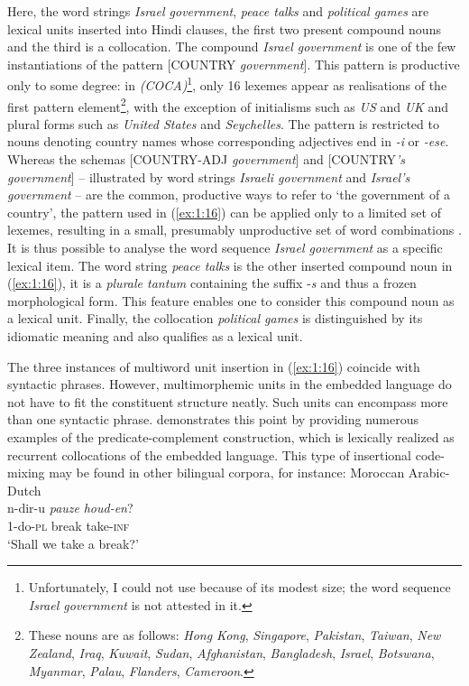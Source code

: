 \noindent Here, the word strings \textit{Israel government}, \textit{peace talks} and \textit{political games} are lexical units inserted into Hindi clauses, the first two present compound nouns and the third is a collocation. The compound \textit{Israel government} is one of the few instantiations of the pattern [COUNTRY \textit{government}]. This pattern is productive only to some degree: in  \textit{(COCA)}\footnote{
Unfortunately, I could not use  because of its modest size; the word sequence \textit{Israel government} is not attested in it.
}, only 16 lexemes appear as realisations of the first pattern element\footnote{These nouns are as follows: \textit{Hong Kong}, \textit{Singapore}, \textit{Pakistan}, \textit{Taiwan}, \textit{New Zealand}, \textit{Iraq}, \textit{Kuwait}, \textit{Sudan}, \textit{Afghanistan}, \textit{Bangladesh}, \textit{Israel}, \textit{Botswana}, \textit{Myanmar}, \textit{Palau}, \textit{Flanders}, \textit{Cameroon}.
}, with the exception of initialisms such as \textit{US} and \textit{UK} and plural forms such as \textit{United States} and \textit{Seychelles}. The pattern is restricted to nouns denoting country names whose corresponding adjectives end in \textit{-i} or \textit{-ese}. Whereas the schemas [\MakeUppercase{country-adj} \textit{government}] and [\MakeUppercase{country}\textit{'s government}] -- illustrated by word strings \textit{Israeli government} and \textit{Israel's government} -- are the common, productive ways to refer to `the government of a country', the pattern used in (\ref{ex:1:16}) can be applied only to a limited set of lexemes, resulting in a small, presumably unproductive set of word combinations \citep[cf.][74]{bauer01}. It is thus possible to analyse the word sequence \textit{Israel government} as a specific lexical item. The word string \textit{peace talks} is the other inserted compound noun in (\ref{ex:1:16}), it is a \textit{plurale tantum} containing the suffix -\textit{s} and thus a frozen morphological form. This feature enables one to consider this compound noun as a lexical unit. Finally, the collocation \textit{political games} is distinguished by its idiomatic meaning and also qualifies as a lexical unit.

The three instances of multiword unit insertion in (\ref{ex:1:16}) coincide with syntactic phrases. However, multimorphemic units in the embedded language do not have to fit the constituent structure neatly. Such units can encompass more than one syntactic phrase. \citet{backus-units-2003} demonstrates this point by providing numerous examples of the predicate-complement construction, which is lexically realized as recurrent collocations of the embedded language. This type of insertional code-mixing may be found in other bilingual corpora, for instance:
\ea \label{ex:1:17}
Moroccan Arabic-Dutch \citep[245]{boumans-syntax-1998}\\
\gll n-dir-u \textit{pauze} \textit{houd-en}?\\
1-do-\textsc{pl} break take-\textsc{inf}\\
\glt `Shall we take a break?'
\z

